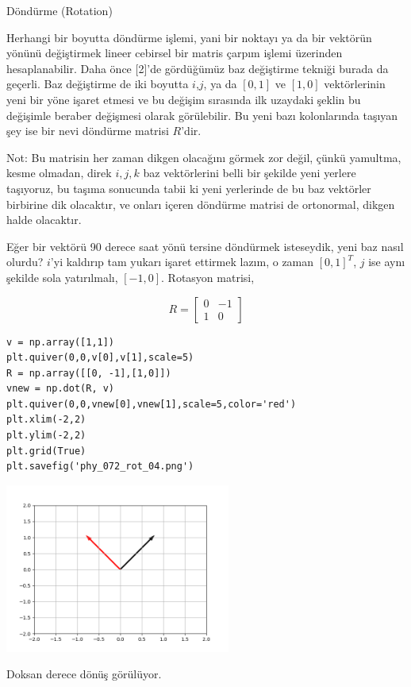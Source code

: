 \documentclass[12pt,fleqn]{article}\usepackage{../../common}
\begin{document}
Döndürme (Rotation)

Herhangi bir boyutta döndürme işlemi, yani bir noktayı ya da bir vektörün yönünü
değiştirmek lineer cebirsel bir matris çarpım işlemi üzerinden hesaplanabilir.
Daha önce [2]'de gördüğümüz baz değiştirme tekniği burada da geçerli. Baz
değiştirme de iki boyutta $i$,$j$, ya da $[0,1]$ ve $[1,0]$ vektörlerinin
yeni bir yöne işaret etmesi ve bu değişim sırasında ilk uzaydaki şeklin
bu değişimle beraber değişmesi olarak görülebilir. Bu yeni bazı kolonlarında
taşıyan şey ise bir nevi döndürme matrisi $R$'dir.

Not: Bu matrisin her zaman dikgen olacağını görmek zor değil, çünkü yamultma,
kesme olmadan, direk $i,j,k$ baz vektörlerini belli bir şekilde yeni yerlere
taşıyoruz, bu taşıma sonucunda tabii ki yeni yerlerinde de bu baz vektörler
birbirine dik olacaktır, ve onları içeren döndürme matrisi de ortonormal, dikgen
halde olacaktır.

Eğer bir vektörü 90 derece saat yönü tersine döndürmek isteseydik, yeni baz
nasıl olurdu? $i$'yi kaldırıp tam yukarı işaret ettirmek lazım, o zaman
$[0,1]^T$, $j$ ise aynı şekilde sola yatırılmalı, $[-1, 0]$. Rotasyon matrisi,

$$
R = \left[\begin{array}{rr}
0 & -1 \\ 1 & 0
\end{array}\right]
$$


\begin{verbatim}
v = np.array([1,1])
plt.quiver(0,0,v[0],v[1],scale=5)
R = np.array([[0, -1],[1,0]])
vnew = np.dot(R, v)
plt.quiver(0,0,vnew[0],vnew[1],scale=5,color='red')
plt.xlim(-2,2)
plt.ylim(-2,2)
plt.grid(True)
plt.savefig('phy_072_rot_04.png')
\end{verbatim}

\includegraphics[width=20em]{phy_072_rot_04.png}

Doksan derece dönüş görülüyor.
\end{document}
